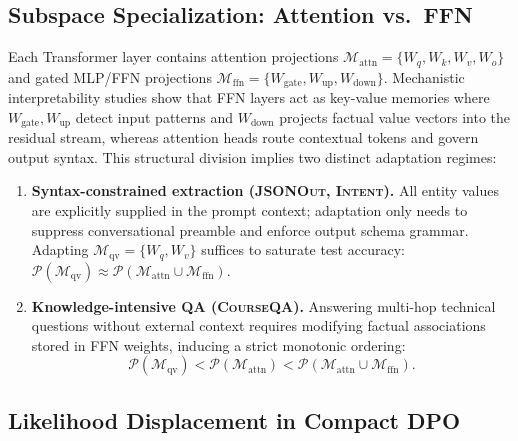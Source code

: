 \documentclass[10pt,a4paper,twocolumn]{article}
\begin{document}
\subsection{Subspace Specialization: Attention vs.\ FFN}
\label{sec:subspace_theory}

Each Transformer layer contains attention projections $\mathcal{M}_{\text{attn}} = \{W_q, W_k, W_v, W_o\}$ and gated MLP/FFN projections $\mathcal{M}_{\text{ffn}} = \{W_{\text{gate}}, W_{\text{up}}, W_{\text{down}}\}$. Mechanistic interpretability studies \citep{geva2021transformer,meng2022locating} show that FFN layers act as key-value memories where $W_{\text{gate}}, W_{\text{up}}$ detect input patterns and $W_{\text{down}}$ projects factual value vectors into the residual stream, whereas attention heads route contextual tokens and govern output syntax. This structural division implies two distinct adaptation regimes:
\begin{enumerate}\setlength{\itemsep}{1pt}\setlength{\parskip}{0pt}\setlength{\topsep}{2pt}
  \item \textbf{Syntax-constrained extraction (\textsc{JSONOut}, \textsc{Intent}).} All entity values are explicitly supplied in the prompt context; adaptation only needs to suppress conversational preamble and enforce output schema grammar. Adapting $\mathcal{M}_{\text{qv}} = \{W_q, W_v\}$ suffices to saturate test accuracy: $\mathcal{P}(\mathcal{M}_{\text{qv}}) \approx \mathcal{P}(\mathcal{M}_{\text{attn}} \cup \mathcal{M}_{\text{ffn}})$.
  \item \textbf{Knowledge-intensive QA (\textsc{CourseQA}).} Answering multi-hop technical questions without external context requires modifying factual associations stored in FFN weights, inducing a strict monotonic ordering:
  \begin{equation}
    \mathcal{P}(\mathcal{M}_{\text{qv}}) < \mathcal{P}(\mathcal{M}_{\text{attn}}) < \mathcal{P}(\mathcal{M}_{\text{attn}} \cup \mathcal{M}_{\text{ffn}}).
    \label{eq:subspace_ineq}
  \end{equation}
\end{enumerate}

\subsection{Likelihood Displacement in Compact DPO}
\label{sec:dpo_theory}
\end{document}
